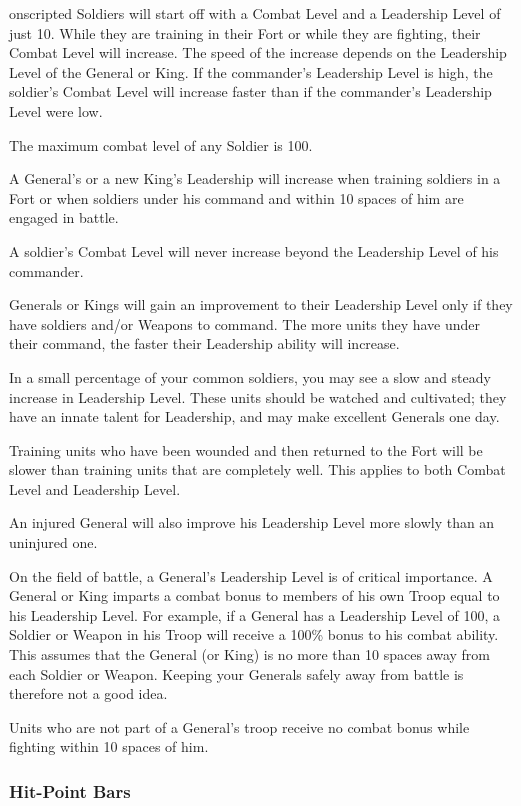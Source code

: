 
onscripted Soldiers will start off with a Combat Level and a Leadership Level of just 10. While they are training in their Fort or while they are fighting, their Combat Level will increase. The speed of the increase depends on the Leadership Level of the General or King. If the commander’s Leadership Level is high, the soldier’s Combat Level will increase faster than if the commander’s Leadership Level were low.

The maximum combat level of any Soldier is 100.

A General’s or a new King’s Leadership will increase when training soldiers in a Fort or when soldiers under his command and within 10 spaces of him are engaged in battle.

A soldier’s Combat Level will never increase beyond the Leadership Level of his commander.

Generals or Kings will gain an improvement to their Leadership Level only if they have soldiers and/or Weapons to command. The more units they have under their command, the faster their Leadership ability will increase.

In a small percentage of your common soldiers, you may see a slow and steady increase in Leadership Level. These units should be watched and cultivated; they have an innate talent for Leadership, and may make excellent Generals one day.

Training units who have been wounded and then returned to the Fort will be slower than training units that are completely well. This applies to both Combat Level and Leadership Level.

An injured General will also improve his Leadership Level more slowly than an uninjured one.

On the field of battle, a General’s Leadership Level is of critical importance. A General or King imparts a combat bonus to members of his own Troop equal to his Leadership Level. For example, if a General has a Leadership Level of 100, a Soldier or Weapon in his Troop will receive a 100\% bonus to his combat ability. This assumes that the General (or King) is no more than 10 spaces away from each Soldier or Weapon. Keeping your Generals safely away from battle is therefore not a good idea.

Units who are not part of a General’s troop receive no combat bonus while fighting within 10 spaces of him.

\subsubsection{Hit-Point Bars}

